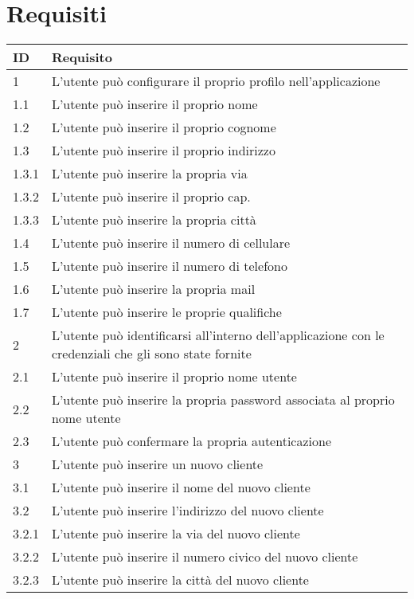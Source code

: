\newpage
\chapter{Requisiti}
\label{cap:Requisiti}


	\begin{longtable}{||p{} p{10.55cm}||} 
		\hline
		\textbf{ID} & \textbf{Requisito} \\\toprule 
		\hline\hline
		1		 & L’utente può configurare il proprio profilo nell’applicazione  \\ 
		1.1		 & L’utente può inserire il proprio nome \\
		1.2 	 & L’utente può inserire il proprio cognome \\
		1.3		 & L’utente può inserire il proprio indirizzo \\
		1.3.1	 & L’utente può inserire la propria via \\
		1.3.2	 & L’utente può inserire il proprio cap. \\
		1.3.3	 & L’utente può inserire la propria città \\
		1.4		 & L’utente può inserire il numero di cellulare \\
		1.5		 & L’utente può inserire il numero di telefono \\
		1.6		 & L’utente può inserire la propria mail \\
		1.7		 & L’utente può inserire le proprie qualifiche \\
		\hline
		2 & L’utente può identificarsi all’interno dell’applicazione con le credenziali che gli sono state fornite  \\
		2.1 & L’utente può inserire il proprio nome utente \\
		2.2 & L’utente può inserire la propria password associata al proprio nome utente \\
		2.3 & L’utente può confermare la propria autenticazione \\
		\hline
		3 & L’utente può inserire un nuovo cliente \\
		3.1 & L’utente può inserire il nome del nuovo cliente\\
		3.2 & L’utente può inserire l’indirizzo del nuovo cliente\\
		3.2.1 & L’utente può inserire la via del nuovo cliente\\
		3.2.2 & L’utente può inserire il numero civico del nuovo cliente\\
		3.2.3 & L’utente può inserire la città del nuovo cliente\\

\end{longtable}

